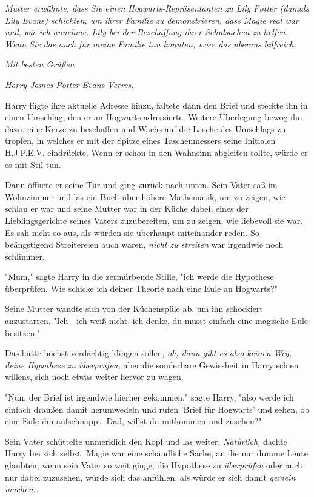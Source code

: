 {\emph{Mutter erwähnte, dass Sie einen Hogwarts-Repräsentanten zu Lily Potter (damals Lily Evans) schickten, um ihrer Familie zu demonstrieren, dass Magie real war und, wie ich annehme, Lily bei der Beschaffung ihrer Schulsachen zu helfen. Wenn Sie das auch für meine Familie tun könnten, wäre das überaus hilfreich.}

\emph{Mit besten Grüßen}

\emph{Harry James Potter-Evans-Verres.}

Harry fügte ihre aktuelle Adresse hinzu, faltete dann den Brief und steckte ihn in einen Umschlag, den er an Hogwarts adressierte. Weitere Überlegung bewog ihn dazu, eine Kerze zu beschaffen und Wachs auf die Lasche des Umschlags zu tropfen, in welches er mit der Spitze eines Taschenmessers seine Initialen H.J.P.E.V. eindrückte. Wenn er schon in den Wahnsinn abgleiten sollte, würde er es mit Stil tun.

Dann öffnete er seine Tür und ging zurück nach unten. Sein Vater saß im Wohnzimmer und las ein Buch über höhere Mathematik, um zu zeigen, wie schlau er war und seine Mutter war in der Küche dabei, eines der Lieblingsgerichte seines Vaters zuzubereiten, um zu zeigen, wie liebevoll sie war. Es sah nicht so aus, als würden sie überhaupt miteinander reden. So beängstigend Streitereien auch waren, \emph{nicht zu streiten} war irgendwie noch schlimmer.

"Mum," sagte Harry in die zermürbende Stille, "ich werde die Hypothese überprüfen. Wie schicke ich deiner Theorie nach eine Eule an Hogwarts?"

Seine Mutter wandte sich von der Küchenspüle ab, um ihn schockiert anzustarren. "Ich - ich weiß nicht, ich denke, du musst einfach eine magische Eule besitzen."

Das hätte höchst verdächtig klingen sollen, \emph{oh, dann gibt es also keinen} \emph{Weg, deine Hypothese zu überprüfen,} aber die sonderbare Gewissheit in Harry schien willens, sich noch etwas weiter hervor zu wagen.

"Nun, der Brief ist irgendwie hierher gekommen," sagte Harry, "also werde ich einfach draußen damit herumwedeln und rufen 'Brief für Hogwarts' und sehen, ob eine Eule ihn aufschnappt. Dad, willst du mitkommen und zusehen?"

Sein Vater schüttelte unmerklich den Kopf und las weiter. \emph{Natürlich,} dachte Harry bei sich selbst. Magie war eine schändliche Sache, an die nur dumme Leute glaubten; wenn sein Vater so weit ginge, die Hypothese zu \emph{überprüfen} oder auch nur dabei zuzusehen, würde sich das anfühlen, als würde er sich damit \emph{gemein machen}…

}

